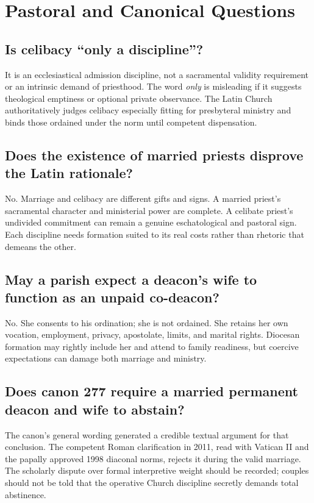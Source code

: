\section{Pastoral and Canonical Questions}

\subsection{Is celibacy ``only a discipline''?}

It is an ecclesiastical admission discipline, not a sacramental validity requirement or an intrinsic demand of priesthood. The word \emph{only} is misleading if it suggests theological emptiness or optional private observance. The Latin Church authoritatively judges celibacy especially fitting for presbyteral ministry and binds those ordained under the norm until competent dispensation.

\subsection{Does the existence of married priests disprove the Latin rationale?}

No. Marriage and celibacy are different gifts and signs. A married priest's sacramental character and ministerial power are complete. A celibate priest's undivided commitment can remain a genuine eschatological and pastoral sign. Each discipline needs formation suited to its real costs rather than rhetoric that demeans the other.

\subsection{May a parish expect a deacon's wife to function as an unpaid co-deacon?}

No. She consents to his ordination; she is not ordained. She retains her own vocation, employment, privacy, apostolate, limits, and marital rights. Diocesan formation may rightly include her and attend to family readiness, but coercive expectations can damage both marriage and ministry.

\subsection{Does canon 277 require a married permanent deacon and wife to abstain?}

The canon's general wording generated a credible textual argument for that conclusion. The competent Roman clarification in 2011, read with Vatican II and the papally approved 1998 diaconal norms, rejects it during the valid marriage. The scholarly dispute over formal interpretive weight should be recorded; couples should not be told that the operative Church discipline secretly demands total abstinence.

